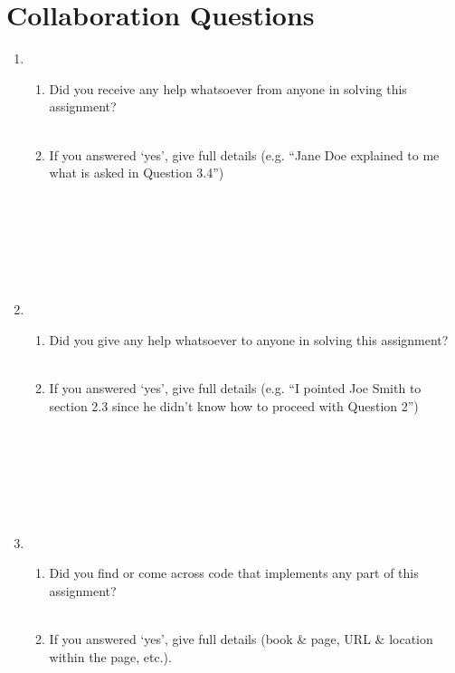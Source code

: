 \section{Collaboration Questions}

\begin{enumerate}
    \item 
    \begin{enumerate}
        \item Did you receive any help whatsoever from anyone in solving this assignment?\\
        \\
        
        \item If you answered `yes', give full details (e.g. “Jane Doe explained to me what is asked in Question 3.4”)\\
        \\
        \\
        \\
        \\
        \\
        \\
        
    \end{enumerate}
    
    
    \item 
    \begin{enumerate}
        \item Did you give any help whatsoever to anyone in solving this assignment?\\
        \\
        
        \item If you answered `yes', give full details (e.g. “I pointed Joe Smith to section 2.3 since he didn’t know how to proceed with Question 2”)\\
        \\
        \\
        \\
        \\
        \\
        \\

        
    \end{enumerate}
    
    \item 
    \begin{enumerate}
        \item Did you find or come across code that implements any part of this assignment?\\
        \\ 
        
        \item If you answered `yes', give full details (book \& page, URL \& location within the page, etc.).\\
        \\
        \\
        \\
        \\
        \\
        \\
        
    \end{enumerate}
\end{enumerate}